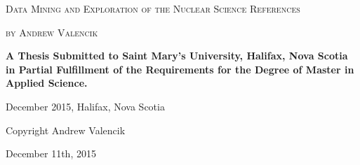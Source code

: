 \begin{titlepage}
    \centering
    {\scshape\LARGE Data Mining and Exploration of the Nuclear Science References\par}
    \vspace{1cm}
    {\scshape\Large by Andrew Valencik\par}
    \vspace{1.5cm}
    {\large\bfseries A Thesis Submitted to Saint Mary’s University, Halifax, Nova Scotia in Partial Fulfillment of the Requirements for the Degree of Master in Applied Science.\par}
    \vspace{2cm}
    {\Large December 2015, Halifax, Nova Scotia\par}
    \vfill
    Copyright Andrew Valencik\par

    \vfill

    {\large December 11th, 2015\par}
\end{titlepage}
\thispagestyle{empty} %
